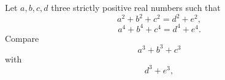 Let $a, b, c, d$ three strictly positive real numbers such that \[a^{2}+b^{2}+c^{2}=d^{2}+e^{2},\] \[a^{4}+b^{4}+c^{4}=d^{4}+e^{4}.\] Compare \[a^{3}+b^{3}+c^{3}\] with \[d^{3}+e^{3},\]